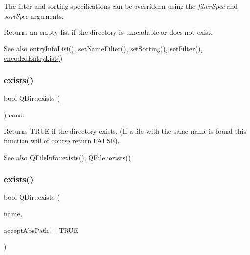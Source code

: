 The filter and sorting specifications can be overridden using the {\itshape filter\+Spec} and {\itshape sort\+Spec} arguments.

Returns an empty list if the directory is unreadable or does not exist.

\begin{DoxySeeAlso}{See also}
\mbox{\hyperlink{class_q_dir_ada9ea9da108cbebd0ac88231f39fced0}{entry\+Info\+List()}}, \mbox{\hyperlink{class_q_dir_a26b95e183a9ba9410219a3ce4d8c3416}{set\+Name\+Filter()}}, \mbox{\hyperlink{class_q_dir_a65280d204cd65975953e3eb2a63da778}{set\+Sorting()}}, \mbox{\hyperlink{class_q_dir_a68d9e723870b5f8226353dc6047a35ee}{set\+Filter()}}, \mbox{\hyperlink{class_q_dir_a584e15a955a13bcabc9ec4b0330b7d5d}{encoded\+Entry\+List()}} 
\end{DoxySeeAlso}
\mbox{\label{class_q_dir_a97e8132d482e374745230de942def208}} 
\subsubsection{\texorpdfstring{exists()}{exists()}\hspace{0.1cm}{\footnotesize\ttfamily [1/2]}}
{\footnotesize\ttfamily bool Q\+Dir\+::exists (\begin{DoxyParamCaption}{ }\end{DoxyParamCaption}) const\hspace{0.3cm}{\ttfamily [virtual]}}

Returns T\+R\+UE if the directory exists. (If a file with the same name is found this function will of course return F\+A\+L\+SE).

\begin{DoxySeeAlso}{See also}
\mbox{\hyperlink{class_q_file_info_af7a247c24ea455875293d6406db652a4}{Q\+File\+Info\+::exists()}}, \mbox{\hyperlink{class_q_file_ad3329694f62a9bb5730f6ba709f8b7cc}{Q\+File\+::exists()}} 
\end{DoxySeeAlso}
\mbox{\label{class_q_dir_a83bb64d2d9e4f7bf0d9d9d0896165be6}} 
\subsubsection{\texorpdfstring{exists()}{exists()}\hspace{0.1cm}{\footnotesize\ttfamily [2/2]}}
{\footnotesize\ttfamily bool Q\+Dir\+::exists (\begin{DoxyParamCaption}\item[{const \mbox{\hyperlink{class_q_string}{Q\+String}} \&}]{name,  }\item[{bool}]{accept\+Abs\+Path = {\ttfamily TRUE} }\end{DoxyParamCaption})\hspace{0.3cm}{\ttfamily [virtual]}}

